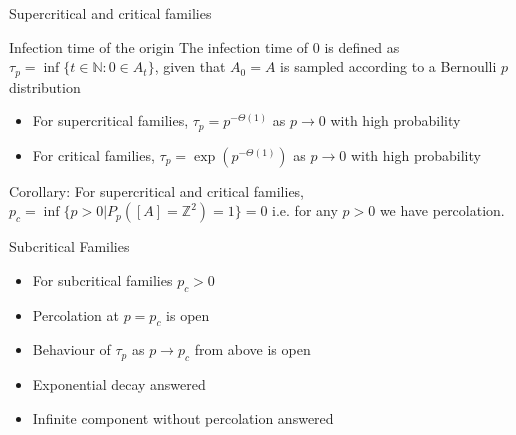 \begin{frame}{Supercritical and critical families}
\begin{block}{Infection time of the origin}
The infection time of 0 is defined as $\tau_p=\inf\{t\in\mathbb{N}: 0 \in A_t\}$, given that $A_0=A$ is sampled according to a Bernoulli $p$ distribution
\end{block}

\begin{itemize}
    \item For supercritical families, $\tau_p=p^{-\Theta(1)}$ as $p\rightarrow 0$ with high probability
    \item For critical families, $\tau_p=\exp(p^{-\Theta(1)})$ as 
    $p\rightarrow 0$ with high probability
\end{itemize}

Corollary: For supercritical and critical families, $p_c=\inf\{p>0|P_p([A]=\mathbb{Z}^2)=1\}=0$ i.e. for any $p>0$ we have percolation.

    
\end{frame}


\begin{frame}{Subcritical Families}

\begin{itemize}
    \item For subcritical families $p_c>0$
    \item Percolation at $p=p_c$ is open
    \item Behaviour of $\tau_p$ as $p\rightarrow p_c$ from above is open
    \item Exponential decay answered 
    \item Infinite component without percolation answered
\end{itemize}

    
\end{frame}
